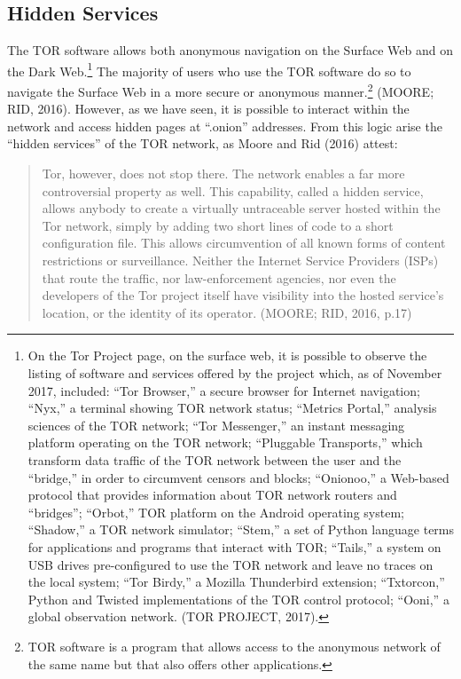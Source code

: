 \subsection{Hidden Services}

The TOR software allows both anonymous navigation on the Surface Web and on the Dark Web.\footnote{On the Tor Project page, on the surface web, it is possible to observe the listing of software and services offered by the project which, as of November 2017, included: ``Tor Browser,'' a secure browser for Internet navigation; ``Nyx,'' a terminal showing TOR network status; ``Metrics Portal,'' analysis sciences of the TOR network; ``Tor Messenger,'' an instant messaging platform operating on the TOR network; ``Pluggable Transports,'' which transform data traffic of the TOR network between the user and the ``bridge,'' in order to circumvent censors and blocks; ``Onionoo,'' a Web-based protocol that provides information about TOR network routers and ``bridges''; ``Orbot,'' TOR platform on the Android operating system; ``Shadow,'' a TOR network simulator; ``Stem,'' a set of Python language terms for applications and programs that interact with TOR; ``Tails,'' a system on USB drives pre-configured to use the TOR network and leave no traces on the local system; ``Tor Birdy,'' a Mozilla Thunderbird extension; ``Txtorcon,'' Python and Twisted implementations of the TOR control protocol; ``Ooni,'' a global observation network. (TOR PROJECT, 2017).} The majority of users who use the TOR software do so to navigate the Surface Web in a more secure or anonymous manner.\footnote{TOR software is a program that allows access to the anonymous network of the same name but that also offers other applications.} (MOORE; RID, 2016). However, as we have seen, it is possible to interact within the network and access hidden pages at ``.onion'' addresses. From this logic arise the ``hidden services'' of the TOR network, as Moore and Rid (2016) attest:

\begin{quote}
Tor, however, does not stop there. The network enables a far more controversial property as well. This capability, called a hidden service, allows anybody to create a virtually untraceable server hosted within the Tor network, simply by adding two short lines of code to a short configuration file. This allows circumvention of all known forms of content restrictions or surveillance. Neither the Internet Service Providers (ISPs) that route the traffic, nor law-enforcement agencies, nor even the developers of the Tor project itself have visibility into the hosted service's location, or the identity of its operator. (MOORE; RID, 2016, p.17)
\end{quote}

